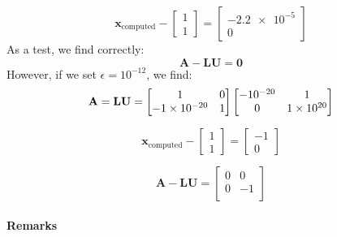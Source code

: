 \documentclass[a4paper,11]{article}
\begin{document}
\[
	\mathbf{x}_{\text{computed}} -
	\begin{bmatrix} 1 \\ 1 \end{bmatrix} 
	= \begin{bmatrix} \num{-2.2e-5} \\ 0 \end{bmatrix}
\]
As a test, we find correctly:
\[
\mathbf{A}-\mathbf{LU} = \mathbf{0}
\]
However, if we set $\epsilon = 10^{-12}$, we find:
\[
	\mathbf{A}=\mathbf{LU}=
	\begin{bmatrix}
		1 & 0 \\
		\num{-1e-20} & 1\\
	\end{bmatrix}
	\begin{bmatrix}
		\num{-e-20} & 1 \\
		0 & \num{1e20} \\
	\end{bmatrix} 
\]

\[
	\mathbf{x}_{\text{computed}} -
	\begin{bmatrix} 1 \\ 1 \end{bmatrix} 
	= \begin{bmatrix} \num{-1} \\ 0 \end{bmatrix}
\]

\[
	\mathbf{A}-\mathbf{LU} = 
	\begin{bmatrix}
		0 & 0 \\
		0 & -1 \\
	\end{bmatrix}
\]



\paragraph{Remarks}
\end{document}
